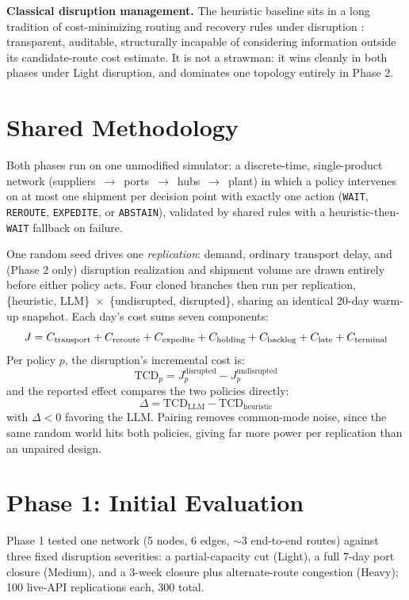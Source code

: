 \documentclass[10pt,twocolumn]{article}
\newcommand{\tcd}{\ensuremath{\mathrm{TCD}}}
\begin{document}
\textbf{Classical disruption management.} The heuristic baseline sits in a long tradition of cost-minimizing routing and recovery rules under disruption \cite{sheffi2005resilient,christopher2004building}: transparent, auditable, structurally incapable of considering information outside its candidate-route cost estimate. It is not a strawman: it wins cleanly in both phases under Light disruption, and dominates one topology entirely in Phase 2.

\section{Shared Methodology}
\label{sec:method}
Both phases run on one unmodified simulator: a discrete-time, single-product network (suppliers~$\to$~ports~$\to$~hubs~$\to$~plant) in which a policy intervenes on at most one shipment per decision point with exactly one action (\texttt{WAIT}, \texttt{REROUTE}, \texttt{EXPEDITE}, or \texttt{ABSTAIN}), validated by shared rules with a heuristic-then-\texttt{WAIT} fallback on failure.

One random seed drives one \emph{replication}: demand, ordinary transport delay, and (Phase 2 only) disruption realization and shipment volume are drawn entirely before either policy acts. Four cloned branches then run per replication, \{heuristic, LLM\}~$\times$~\{undisrupted, disrupted\}, sharing an identical 20-day warm-up snapshot. Each day's cost sums seven components:
\begin{equation}
\resizebox{0.95\linewidth}{!}{$J = C_{\text{transport}} + C_{\text{reroute}} + C_{\text{expedite}} + C_{\text{holding}} + C_{\text{backlog}} + C_{\text{late}} + C_{\text{terminal}}$}
\label{eq:cost}
\end{equation}
Per policy $p$, the disruption's incremental cost is:
\begin{equation}
\tcd_p = J^{\text{disrupted}}_p - J^{\text{undisrupted}}_p
\label{eq:tcd}
\end{equation}
and the reported effect compares the two policies directly:
\begin{equation}
\Delta = \tcd_{\text{LLM}} - \tcd_{\text{heuristic}}
\label{eq:delta}
\end{equation}
with $\Delta<0$ favoring the LLM. Pairing removes common-mode noise, since the same random world hits both policies, giving far more power per replication than an unpaired design.

\section{Phase 1: Initial Evaluation}
\label{sec:phase1}
Phase 1 tested one network (5 nodes, 6 edges, $\sim$3 end-to-end routes) against three fixed disruption severities: a partial-capacity cut (Light), a full 7-day port closure (Medium), and a 3-week closure plus alternate-route congestion (Heavy); 100 live-API replications each, 300 total.
\end{document}
